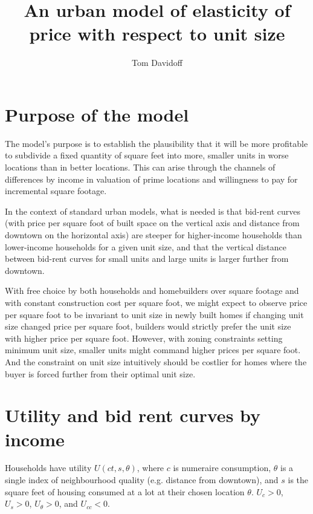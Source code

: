 \documentclass[12pt]{article}
\begin{document}
\title{An urban model of elasticity of price with respect to unit size}
\author{Tom Davidoff}
\maketitle

\onehalfspacing

\section{Purpose of the model}

The model's purpose is to establish the plausibility that it will be more
profitable to subdivide a fixed quantity of square feet into more, smaller
units in worse locations than in better locations. This can arise through the
channels of differences by income in valuation of prime locations and
willingness to pay for incremental square footage.

In the context of standard urban models, what is needed is that bid-rent
curves (with price per square foot of built space on the vertical axis and
distance from downtown on the horizontal axis) are steeper for higher-income
households than lower-income households for a given unit size, and that the
vertical distance between bid-rent curves for small units and large units is
larger further from downtown.

With free choice by both households and homebuilders over square footage and
with constant construction cost per square foot, we might expect to observe
price per square foot to be invariant to unit size in newly built homes if
changing unit size changed price per square foot, builders would strictly
prefer the unit size with higher price per square foot. However, with zoning
constraints setting minimum unit size, smaller units might command higher
prices per square foot. And the constraint on unit size intuitively should be
costlier for homes where the buyer is forced further from their optimal unit
size.

\section{Utility and bid rent curves by income}

Households have utility $U\left(ct,s,\theta\right)$, where
$c$ is numeraire consumption, $\theta$ is a single index of neighbourhood
quality (e.g. distance from downtown), and $s$ is the square feet of housing
consumed at a lot at their chosen location $\theta$. $U_{c}>0$, $U_{s}>0$,
$U_{\theta}>0$, and $U_{cc}<0$.
\end{document}
